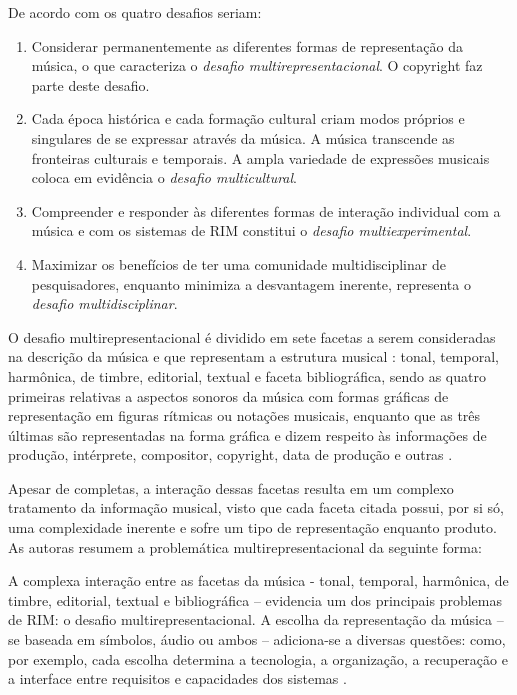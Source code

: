 De acordo com  os quatro desafios seriam:

\begin{citacao}
    \begin{enumerate}
        \item Considerar permanentemente as diferentes formas de representação da música, o que caracteriza o \textit{desafio multirepresentacional}. O copyright faz parte deste desafio.
        \item Cada época histórica e cada formação cultural criam modos próprios e singulares de se expressar através da música. A música transcende as fronteiras culturais e temporais. A ampla variedade de expressões musicais coloca em evidência o \textit{desafio multicultural}.
        \item Compreender e responder às diferentes formas de interação individual com a música e com os sistemas de RIM constitui o \textit{desafio multiexperimental}.
        \item Maximizar os benefícios de ter uma comunidade multidisciplinar de pesquisadores, enquanto minimiza a desvantagem inerente, representa o \textit{desafio multidisciplinar}.
    \end{enumerate} 
\end{citacao}

O desafio multirepresentacional é dividido em sete facetas a serem consideradas na descrição da música e que representam a estrutura musical \cite{downie2003}: tonal, temporal, harmônica, de timbre, editorial, textual e faceta bibliográfica, sendo as quatro primeiras relativas a aspectos sonoros da música com formas gráficas de representação em figuras rítmicas ou notações musicais, enquanto que as três últimas são representadas na forma gráfica e dizem respeito às informações de produção, intérprete, compositor, copyright, data de produção e outras \cite{barros2012}.

Apesar de completas, a interação dessas facetas resulta em um complexo tratamento da informação musical, visto que cada faceta citada possui, por si só, uma complexidade inerente e sofre um tipo de representação enquanto produto. As autoras  resumem a problemática multirepresentacional da seguinte forma:

\begin{citacao}
    A complexa interação entre as facetas da música - tonal, temporal, harmônica, de timbre, editorial, textual e bibliográfica – evidencia um dos principais problemas de RIM: o desafio multirepresentacional. A escolha da representação da música – se baseada em símbolos, áudio ou ambos – adiciona-se a diversas questões: como, por exemplo, cada escolha determina a tecnologia, a organização, a recuperação e a interface entre requisitos e capacidades dos sistemas \cite{santini&souza2007}.
\end{citacao}

